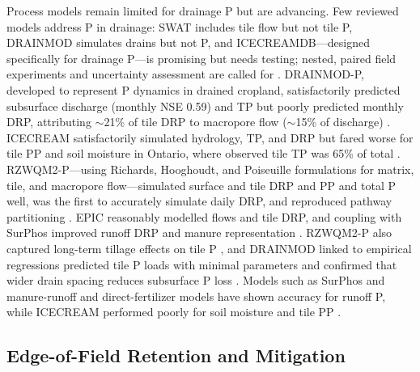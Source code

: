 Process models remain limited for drainage P but are advancing. Few reviewed models address P in
drainage: SWAT includes tile flow but not tile P, DRAINMOD simulates drains but not P, and
ICECREAMDB---designed specifically for drainage P---is promising but needs testing; nested,
paired field experiments and uncertainty assessment are called for
\parencite{Radcliffe2015,Wang2020b}. DRAINMOD-P, developed to represent P dynamics in drained
cropland, satisfactorily predicted subsurface discharge (monthly NSE 0.59) and TP but poorly
predicted monthly DRP, attributing $\sim$21\% of tile DRP to macropore flow ($\sim$15\% of
discharge) \parencite{Askar2021,Askar2021b}. ICECREAM satisfactorily simulated hydrology, TP, and
DRP but fared worse for tile PP and soil moisture in Ontario, where observed tile TP was 65\% of
total \parencite{Qi2018}. RZWQM2-P---using Richards, Hooghoudt, and Poiseuille formulations for
matrix, tile, and macropore flow---simulated surface and tile DRP and PP and total P well, was the
first to accurately simulate daily DRP, and reproduced pathway partitioning
\parencite{Sadhukhan2019,Sadhukhan2019b,Grewal2025}. EPIC reasonably modelled flows and tile DRP,
and coupling with SurPhos improved runoff DRP and manure representation
\parencite{Wang2019}. RZWQM2-P also captured long-term tillage effects on tile P
\parencite{Pan2023}, and DRAINMOD linked to empirical regressions predicted tile P loads with
minimal parameters and confirmed that wider drain spacing reduces subsurface P loss
\parencite{Morrison2013}. Models such as SurPhos and manure-runoff and direct-fertilizer models
have shown accuracy for runoff P, while ICECREAM performed poorly for soil moisture and tile PP
\parencite{Wang2020b}.

\subsection{Edge-of-Field Retention and Mitigation}

